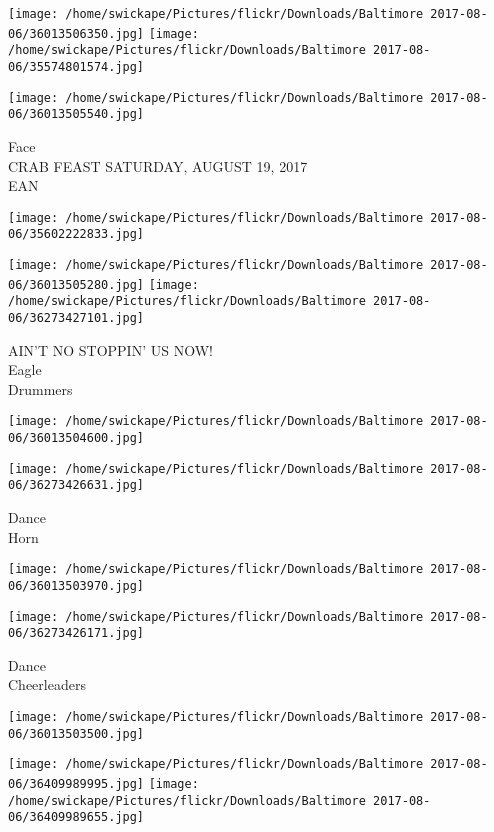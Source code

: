 \documentclass[10pt,letterpaper]{article}
\begin{document}
\texttt{[image: /home/swickape/Pictures/flickr/Downloads/Baltimore 2017-08-06/36013506350.jpg]}
\texttt{[image: /home/swickape/Pictures/flickr/Downloads/Baltimore 2017-08-06/35574801574.jpg]}

\texttt{[image: /home/swickape/Pictures/flickr/Downloads/Baltimore 2017-08-06/36013505540.jpg]}

Face\\
CRAB FEAST SATURDAY, AUGUST 19, 2017\\
EAN
\pagebreak

\texttt{[image: /home/swickape/Pictures/flickr/Downloads/Baltimore 2017-08-06/35602222833.jpg]}

\vspace{0.25in}
\texttt{[image: /home/swickape/Pictures/flickr/Downloads/Baltimore 2017-08-06/36013505280.jpg]}
\texttt{[image: /home/swickape/Pictures/flickr/Downloads/Baltimore 2017-08-06/36273427101.jpg]}

AIN'T NO STOPPIN' US NOW!\\
Eagle\\
Drummers
\pagebreak

\texttt{[image: /home/swickape/Pictures/flickr/Downloads/Baltimore 2017-08-06/36013504600.jpg]}

\vspace{0.25in}
\texttt{[image: /home/swickape/Pictures/flickr/Downloads/Baltimore 2017-08-06/36273426631.jpg]}

Dance\\
Horn
\pagebreak

\texttt{[image: /home/swickape/Pictures/flickr/Downloads/Baltimore 2017-08-06/36013503970.jpg]}

\vspace{0.25in}
\texttt{[image: /home/swickape/Pictures/flickr/Downloads/Baltimore 2017-08-06/36273426171.jpg]}

Dance\\
Cheerleaders
\pagebreak

\texttt{[image: /home/swickape/Pictures/flickr/Downloads/Baltimore 2017-08-06/36013503500.jpg]}

\vspace{0.25in}
\texttt{[image: /home/swickape/Pictures/flickr/Downloads/Baltimore 2017-08-06/36409989995.jpg]}
\texttt{[image: /home/swickape/Pictures/flickr/Downloads/Baltimore 2017-08-06/36409989655.jpg]}
\end{document}
